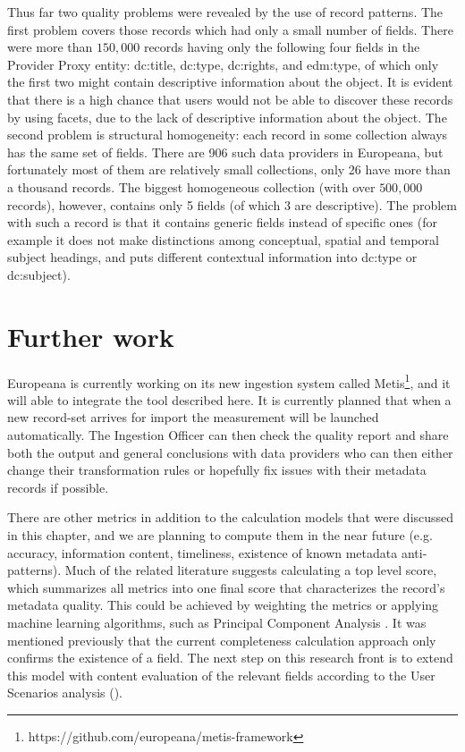 Thus far two quality problems were revealed by the use of record patterns. The first problem covers those records which had only a small number of fields. There were more than $150,000$ records having only the following four fields in the Provider Proxy entity: dc:title, dc:type, dc:rights, and edm:type, of which only the first two might contain descriptive information about the object. It is evident that there is a high chance that users would not be able to discover these records by using facets, due to the lack of descriptive information about the object. The second problem is structural homogeneity: each record in some collection always has the same set of fields. There are 906 such data providers in Europeana, but fortunately most of them are relatively small collections, only 26 have more than a thousand records. The biggest homogeneous collection (with over $500,000$ records), however, contains only 5 fields (of which 3 are descriptive). The problem with such a record is that it contains generic fields instead of specific ones (for example it does not make distinctions among conceptual, spatial and temporal subject headings, and puts different contextual information into dc:type or dc:subject).

\section{Further work}

Europeana is currently working on its new ingestion system called Metis\footnote{https://github.com/europeana/metis-framework}, and it will able to integrate the tool described here. It is currently planned that when a new record-set arrives for import the measurement will be launched automatically. The Ingestion Officer can then check the quality report and share both the output and general conclusions with data providers who can then either change their transformation rules or hopefully fix issues with their metadata records if possible.

There are other metrics in addition to the calculation models that were discussed in this chapter, and we are planning to compute them in the near future (e.g. accuracy, information content, timeliness, existence of known metadata anti-patterns). Much of the related literature suggests calculating a top level score, which summarizes all metrics into one final score that characterizes the record’s metadata quality. This could be achieved by weighting the metrics or applying machine learning algorithms, such as Principal Component Analysis \cite{james2013}. It was mentioned previously that the current completeness calculation approach only confirms the existence of a field. The next step on this research front is to extend this model with content evaluation of the relevant fields according to the User Scenarios analysis (\cite{hill-charles-isaac2015}).

